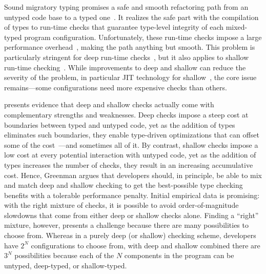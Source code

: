 
Sound migratory typing promises a safe and smooth refactoring path from an
untyped code base to a typed one~\cite{tf-dls-2006, tfffgksst-snapl-2017}. It
realizes the safe part with the compilation of types to run-time checks that
guarantee type-level integrity of each mixed-typed program configuration.
Unfortunately, these run-time checks impose a large performance
overhead~\cite{gtnffvf-jfp-2019}, making the path anything but smooth.
This problem is particularly stringent for deep run-time
checks~\cite{tf-dls-2006, st-sfp-2006}, but it also applies to shallow run-time
checking~\cite{gm-pepm-2018}.
While improvements to deep and shallow can reduce the severity of the
problem, in particular JIT technology for
shallow~\cite{rmhn-ecoop-2019,vsc-dls-2019},
the core issue remains---some configurations need more expensive checks than
others.

\citet{g-thesis-2020,g-deep-shallow} presents evidence that deep and shallow
checks actually come with complementary strengths and weaknesses. Deep checks
impose a steep cost at boundaries between typed and untyped code, yet as
the addition of types eliminates such boundaries, they
enable type-driven optimizations that can offset some of the
cost~\cite{s-northeastern-2015}---and sometimes all of it.
By contrast, shallow checks impose a low cost at every potential interaction
with untyped code, yet as the addition of types increases the number of
checks, they result in an increasing accumulative cost.
Hence, Greenman argues that developers should, in
principle, be able to mix and match deep and shallow checking to get the
best-possible type checking benefits with a tolerable performance penalty.
Initial empirical data is promising: with the right mixture of checks,
it is possible to avoid order-of-magnitude slowdowns that come from either
deep or shallow checks alone.
Finding a ``right'' mixture, however, presents a challenge because there
are many possibilities to choose from.
Whereas in a purely deep (or shallow) checking scheme, developers have
$2^N$ configurations to choose from, with deep and shallow combined
there are $3^N$ possibilities because each of the $N$ components in
the program can be untyped, deep-typed, or shallow-typed.

